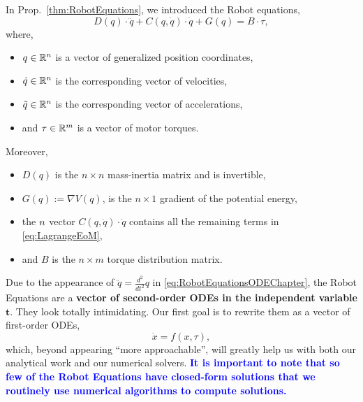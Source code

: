 In Prop.~\ref{thm:RobotEquations}, we introduced the Robot equations, 
\begin{equation}
\label{eq:RobotEquationsODEChapter}
D(q) \cdot \ddot{q} + C(q, \dot{q}) \cdot \dot{q} + G(q) = B \cdot \tau,
\end{equation}
where,
\begin{itemize}
\item $q\in \mathbb R^n$ is a vector of generalized position coordinates,
\item $\dot{q} \in \mathbb R^n$ is the corresponding vector of velocities,
\item $\ddot{q} \in \mathbb R^n$ is the corresponding vector of accelerations,
\item and $\tau\in \mathbb R^m$ is a vector of motor torques.
\end{itemize}
Moreover, 
\begin{itemize}
\item $D(q)$ is the $n \times n$ mass-inertia matrix and is invertible,
    \item $G(q) := \nabla V(q)$, is the $n \times 1$ gradient of the potential energy,
    \item the $n \time 1$ vector $C(q, \dot{q}) \cdot \dot{q}$ contains all the remaining terms in \eqref{eq:LagrangeEoM},
    \item and $B$ is the $n \times m$ torque distribution matrix. 
\end{itemize} 
Due to the appearance of $\ddot{q}= \frac{d^2}{dt^2} q$ in \eqref{eq:RobotEquationsODEChapter}, the Robot Equations are a \textbf{vector of second-order ODEs in the independent variable $\bm{t}$}. They look totally intimidating. Our first goal is to rewrite them as a vector of first-order ODEs,
$$ \dot{x} = f(x, \tau),$$
which, beyond appearing ``more approachable'', will greatly help us with both our analytical work and our numerical solvers. \textcolor{blue}{\bf It is important to note that so few of the Robot Equations have closed-form solutions that we routinely use numerical algorithms to compute solutions.} 

\bigskip

